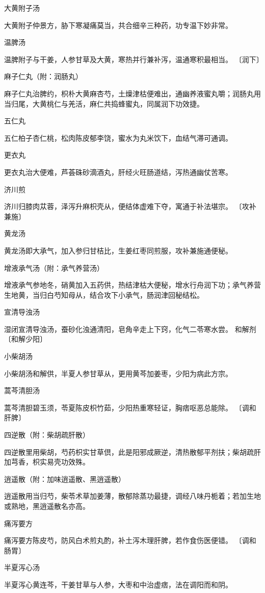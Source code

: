 \documentclass[a4paper,12pt,UTF8,twoside]{ctexbook}
\begin{document}
大黄附子汤

大黄附子仲景方，胁下寒凝痛莫当，共合细辛三种药，功专温下妙非常。

温脾汤

温脾附子与干姜，人参甘草及大黄，寒热并行兼补泻，温通寒积最相当。
〔润下〕

麻子仁丸（附：润肠丸）

麻子仁丸治脾约，枳朴大黄麻杏芍，土燥津枯便难出，通幽养液蜜丸嚼；润肠丸用当归尾，大黄桃仁与羌活，麻仁共捣蜂蜜丸，同属润下功效捷。

五仁丸

五仁柏子杏仁桃，松肉陈皮郁李饶，蜜水为丸米饮下，血结气滞可通调。

更衣丸

更衣丸治大便难，芦荟硃砂滴酒丸，肝经火旺肠道结，泻热通幽仗苦寒。

济川煎

济川归膝肉苁蓉，泽泻升麻枳壳从，便结体虚难下夺，寓通于补法堪宗。
〔攻补兼施〕

黄龙汤

黄龙汤即大承气，加入参归甘桔比，生姜红枣同煎服，攻补兼施通便秘。

增液承气汤（附：承气养营汤）

增液承气参地冬，硝黄加入五药供，热结津枯大便秘，增水行舟润下功；承气养营生地黄，当归白芍知母从，结合攻下小承气，肠润津回秘结松。

宣清导浊汤

湿闭宣清导浊汤，蚕砂化浊通清阳，皂角辛走上下窍，化气二苓寒水尝。
和解剂
〔和解少阳〕

小柴胡汤

小柴胡汤和解供，半夏人参甘草从，更用黄芩加姜枣，少阳为病此方宗。

蒿芩清胆汤

蒿芩清胆碧玉须，苓夏陈皮枳竹茹，少阳热重寒轻证，胸痞呕恶总能除。
〔调和肝脾〕

四逆散（附：柴胡疏肝散）

四逆散里用柴胡，芍药枳实甘草倶，此是阳邪成厥逆，清热散郁平剂扶；柴胡疏肝加芎香，枳实易壳功效殊。

逍遥散（附：加味逍遥散、黑逍遥散）

逍遥散用当归芍，柴苓术草加姜薄，散郁除蒸功最捷，调经八味丹栀着；若加生地或熟地，黑逍遥散名亦高。

痛泻要方

痛泻要方陈皮芍，防风白术煎丸酌，补土泻木理肝脾，若作食伤医便错。
〔调和肠胃〕

半夏泻心汤

半夏泻心黄连芩，干姜甘草与人参，大枣和中治虚痞，法在调阳而和阴。
\end{document}
